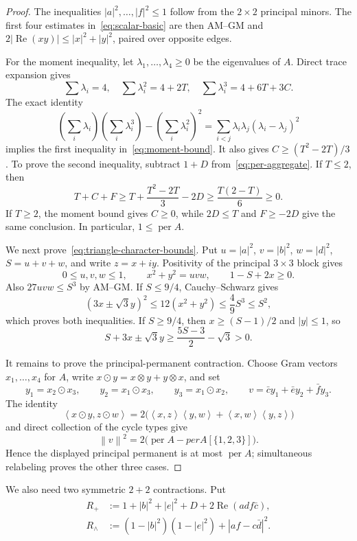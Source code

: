 \documentclass[10pt,twoside]{siamart1116}
\newcommand{\per}{\operatorname{per}}
\newcommand{\Rea}{\operatorname{Re}}
\newcommand{\ip}[2]{\left\langle #1,#2\right\rangle}
\newcommand{\norm}[1]{\left\lVert #1\right\rVert}
\begin{document}
\begin{proof}
The inequalities $|a|^2,\ldots,|f|^2\leq1$ follow from the $2\times2$
principal minors.  The first four estimates in~\eqref{eq:scalar-basic} are
then AM--GM and
$2|\Rea(xy)|\leq|x|^2+|y|^2$, paired over opposite edges.

For the moment inequality, let $\lambda_1,\dots,\lambda_4\geq0$ be the
eigenvalues of $A$.  Direct trace expansion gives
\[
 \sum\lambda_i=4,\quad
 \sum\lambda_i^2=4+2T,\quad
 \sum\lambda_i^3=4+6T+3C.
\]
The exact identity
\[
 \left(\sum_i\lambda_i\right)\left(\sum_i\lambda_i^3\right)
 -\left(\sum_i\lambda_i^2\right)^2
 =\sum_{i<j}\lambda_i\lambda_j(\lambda_i-\lambda_j)^2
\]
implies the first inequality in~\eqref{eq:moment-bound}.  It also gives
$C\geq(T^2-2T)/3$.  To prove the second inequality,
subtract $1+D$ from~\eqref{eq:per-aggregate}.  If
$T\leq2$, then
\[
 T+C+F
 \geq T+\frac{T^2-2T}{3}-2D
 \geq \frac{T(2-T)}6\geq0.
\]
If $T\geq2$, the moment bound gives $C\geq0$, while
$2D\leq T$ and $F\geq-2D$ give the same
conclusion.  In particular, $1\leq\per A$.

We next prove~\eqref{eq:triangle-character-bounds}.  Put
$u=|a|^2$, $v=|b|^2$, $w=|d|^2$, $S=u+v+w$, and write $z=x+iy$.
Positivity of the principal $3\times3$ block gives
\[
 0\leq u,v,w\leq1,\qquad x^2+y^2=uvw,
 \qquad 1-S+2x\geq0.
\]
Also $27uvw\leq S^3$ by AM--GM.  If $S\leq9/4$, Cauchy--Schwarz gives
\[
 (3x\pm\sqrt3y)^2\leq12(x^2+y^2)
 \leq\frac49S^3\leq S^2,
\]
which proves both inequalities.  If $S\geq9/4$, then
$x\geq(S-1)/2$ and $|y|\leq1$, so
\[
 S+3x\pm\sqrt3y
 \geq\frac{5S-3}{2}-\sqrt3>0.
\]

It remains to prove the principal-permanent contraction.  Choose Gram
vectors $x_1,\ldots,x_4$ for $A$, write
$x\odot y=x\otimes y+y\otimes x$, and set
\[
 y_1=x_2\odot x_3,\qquad y_2=x_1\odot x_3,\qquad
 y_3=x_1\odot x_2,\qquad
 v=\bar c y_1+\bar e y_2+\bar f y_3.
\]
The identity
\[
 \ip{x\odot y}{z\odot w}
 =2\bigl(\ip{x}{z}\ip{y}{w}+\ip{x}{w}\ip{y}{z}\bigr)
\]
and direct collection of the cycle types give
\[
 \norm v^2=2\bigl(\per A-per A[\{1,2,3\}]\bigr).
\]
Hence the displayed principal permanent is at most $\per A$; simultaneous
relabeling proves the other three cases.
\end{proof}

We also need two symmetric $2+2$ contractions.  Put
\begin{align}
 R_+&:=1+|b|^2+|e|^2+D
       +2\Rea(a d f\bar c),\label{eq:Rplus}\\
 R_\wedge&:=(1-|b|^2)(1-|e|^2)+|af-c\bar d|^2.\label{eq:Rwedge}
\end{align}
\end{document}
